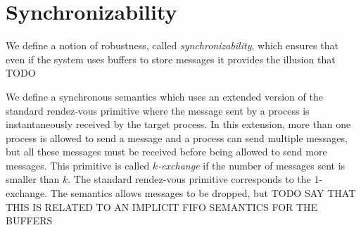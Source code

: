 \section{Synchronizability}

We define a notion of robustness, called \emph{synchronizability}, which ensures that even if the system uses buffers to store messages it provides the illusion that TODO

We define a synchronous semantics which uses an extended version of the standard rendez-vous primitive where the message sent by a process is instantaneously received by the target process. In this extension, more than one process is allowed to send a message and a process can send multiple messages, but all these messages must be received before being allowed to send more messages. This  primitive is called \emph{$k$-exchange} if the number of messages sent is smaller than $k$. The standard rendez-vous primitive corresponds to the $1$-exchange. 
The semantics allows messages to be dropped, but  TODO SAY THAT THIS IS RELATED TO AN IMPLICIT FIFO SEMANTICS FOR THE BUFFERS

